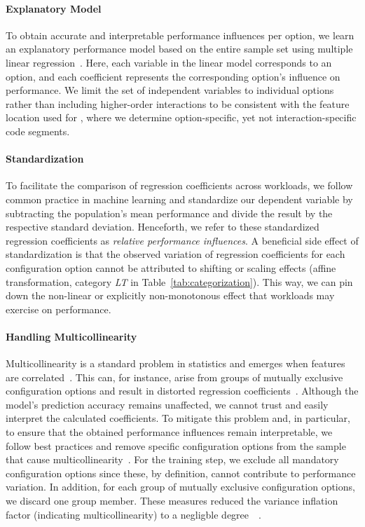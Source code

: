{{{\paragraph*{Explanatory Model}
To obtain accurate and interpretable performance influences per option, we learn an explanatory performance model based on the entire sample set using multiple linear regression~\cite{dorn2020,siegmundPerformanceinfluenceModelsHighly2015,perLasso}. Here, each variable in the linear model corresponds to an option, and each coefficient represents the corresponding option's influence on performance. 
We limit the set of independent variables to individual options rather than including higher-order interactions to be consistent with the feature location used for , where we determine option-specific, yet not interaction-specific code segments.
\paragraph*{Standardization}
To facilitate the comparison of regression coefficients across workloads, we follow common practice in machine learning and standardize our dependent variable by subtracting the population’s mean performance and divide the result by the respective standard deviation. Henceforth, we refer to these standardized regression coefficients as \textit{relative performance influences}. A beneficial side effect of standardization is that the observed variation of regression coefficients for each configuration option cannot be attributed to shifting or scaling effects (affine transformation, category \colorbox{lt-color}{\textit{LT}} in Table~\ref{tab:categorization}). This way, we can pin down  the non-linear or explicitly non-monotonous effect that workloads may exercise on performance.
\paragraph*{Handling Multicollinearity} Multicollinearity is a standard problem in statistics and emerges when features are correlated~\cite{Daoud_2017}. This can, for instance, arise from groups of mutually exclusive configuration options and result in distorted regression coefficients~\cite{dorn2020}. Although the model's prediction accuracy remains unaffected, we cannot trust and easily interpret the calculated coefficients. To mitigate this problem and, in particular, to ensure that the obtained performance influences remain interpretable, we follow best practices and remove specific configuration options from the sample that cause multicollinearity~\cite{dorn2020}. For the training step, we exclude all mandatory configuration options since these, by definition, cannot contribute to performance variation. In addition, for each group of mutually exclusive configuration options, we discard one group member. These measures reduced the variance inflation factor (indicating multicollinearity) to a negligble degree~\cite{o2007caution}~.


}}}
